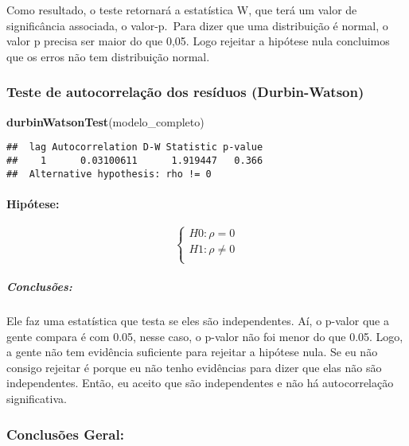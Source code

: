 \documentclass[
]{article}
\newenvironment{Shaded}{\begin{snugshade}}{\end{snugshade}}
\newcommand{\FunctionTok}[1]{\textcolor[rgb]{0.13,0.29,0.53}{\textbf{#1}}}
\newcommand{\NormalTok}[1]{#1}
\begin{document}
Como resultado, o teste retornará a estatística W, que terá um valor de
significância associada, o valor-p.~Para dizer que uma distribuição é
normal, o valor p precisa ser maior do que 0,05. Logo rejeitar a
hipótese nula concluimos que os erros não tem distribuição normal.

\hypertarget{teste-de-autocorrelauxe7uxe3o-dos-resuxedduos-durbin-watson}{%
\subsubsection{Teste de autocorrelação dos resíduos
(Durbin-Watson)}\label{teste-de-autocorrelauxe7uxe3o-dos-resuxedduos-durbin-watson}}

\begin{Shaded}
\begin{Highlighting}[]
\FunctionTok{durbinWatsonTest}\NormalTok{(modelo\_completo)}
\end{Highlighting}
\end{Shaded}

\begin{verbatim}
##  lag Autocorrelation D-W Statistic p-value
##    1      0.03100611      1.919447   0.366
##  Alternative hypothesis: rho != 0
\end{verbatim}

\hypertarget{hipuxf3tese-6}{%
\paragraph{Hipótese:}\label{hipuxf3tese-6}}

\[
\left\{ \begin{array}{rc} 
H0: 𝜌 = 0 \\ 
H1: 𝜌 \neq 0 \\ 
\end{array}\right.
\]

\hypertarget{conclusuxf5es-6}{%
\subparagraph{Conclusões:}\label{conclusuxf5es-6}}

Ele faz uma estatística que testa se eles são independentes. Aí, o
p-valor que a gente compara é com 0.05, nesse caso, o p-valor não foi
menor do que 0.05. Logo, a gente não tem evidência suficiente para
rejeitar a hipótese nula. Se eu não consigo rejeitar é porque eu não
tenho evidências para dizer que elas não são independentes. Então, eu
aceito que são independentes e não há autocorrelação significativa.

\hypertarget{conclusuxf5es-geral}{%
\subsubsection{Conclusões Geral:}\label{conclusuxf5es-geral}}
\end{document}
